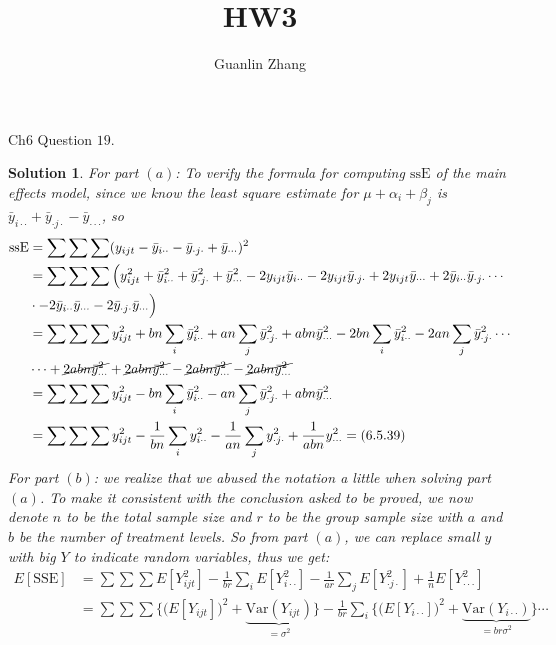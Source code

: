 \documentclass[11pt]{article}
\title{HW3}
\author{Guanlin Zhang}
\newtheorem{sol}{Solution}
\begin{document}
Ch6 Question $19$.
\begin{sol}
	For part $(a)$:\vskip 2mm
	To verify the formula for computing $\text{ssE}$ of the main effects model, since we know the least square estimate for $\mu + \alpha_i + \beta_j$ is $\bar{y}_{i\cdot\cdot} + \bar{y}_{\cdot j \cdot} - \bar{y}_{\cdot\cdot\cdot}$, so
	\begin{align*}
		\text{ssE} &= \sum\sum\sum(y_{ijt} - \bar{y}_{i\cdot\cdot} - \bar{y}_{\cdot j \cdot} + \bar{y}_{\cdot\cdot\cdot})^2\\
		&= \sum\sum\sum \Big(y^2_{ijt} + \bar{y}^2_{i\cdot\cdot} + \bar{y}^2_{\cdot j\cdot} + \bar{y}^2_{\cdot\cdot\cdot}- 2y_{ijt}\bar{y}_{i\cdot\cdot} - 2y_{ijt}\bar{y}_{\cdot j\cdot } + 2y_{ijt}\bar{y}_{\cdot\cdot\cdot} + 2\bar{y}_{i\cdot\cdot}\bar{y}_{\cdot j\cdot}\cdots\\
		&\cdot - 2\bar{y}_{i\cdot\cdot}\bar{y}_{\cdot\cdot\cdot} - 2\bar{y}_{\cdot j\cdot}\bar{y}_{\cdot\cdot\cdot}\Big) \\
		&= \sum\sum\sum y^2_{ijt} + bn\sum_i\bar{y}^2_{i\cdot\cdot} + an\sum_j\bar{y}^2_{\cdot j\cdot} + abn\bar{y}^2_{\cdot\cdot\cdot} - 2bn\sum_i \bar{y}^2_{i\cdot\cdot} - 2an\sum_j \bar{y}^2_{\cdot j\cdot}\cdots\\
		&\cdots + \cancel{2abn\bar{y}^2_{\cdot\cdot\cdot}} + \cancel{2abn\bar{y}^2_{\cdot\cdot\cdot}}
		- \cancel{2abn\bar{y}^2_{\cdot\cdot\cdot}} - \cancel{2abn\bar{y}^2_{\cdot\cdot\cdot}}\\
		&= \sum\sum\sum y^2_{ijt} - bn\sum_i \bar{y}^2_{i\cdot\cdot} - an\sum_j\bar{y}^2_{\cdot j\cdot} + abn\bar{y}^2_{\cdot\cdot\cdot}\\
		&= \sum\sum\sum y^2_{ijt} - \frac{1}{bn}\sum_i y^2_{i\cdot\cdot} - \frac{1}{an}\sum_j y^2_{\cdot j\cdot} + \frac{1}{abn}y^2_{\cdot\cdot\cdot} = (6.5.39)
	\end{align*}
	For part $(b)$:\vskip 2mm
	we realize that we abused the notation a little when solving part $(a)$. To make it consistent with the conclusion asked to be proved, we now denote $n$ to be the total sample size and $r$ to be the group sample size with $a$ and $b$ be the number of treatment levels.\vskip 2mm
	So from part $(a)$, we can replace small $y$ with big $Y$ to indicate random variables, thus we get:
	\begin{align*}
		E[\text{SSE}] &= \sum\sum\sum E[Y^2_{ijt}] - \frac{1}{br}\sum_i E[Y^2_{i\cdot\cdot}] - \frac{1}{ar}\sum_j E[Y^2_{\cdot j\cdot}] + \frac{1}{n}E[Y^2_{\cdot\cdot\cdot}]\\
		&= \sum\sum\sum \Big\{\Big(E[Y_{ijt}]\Big)^2 + \underbrace{\text{Var}(Y_{ijt})}_{ = \sigma^2}\Big\} - \frac{1}{br}\sum_i\Big\{\Big(E[Y_{i\cdot\cdot}]\Big)^2 + \underbrace{\text{Var}(Y_{i\cdot\cdot})}_{= br\sigma^2}\Big\}\cdots\\

\end{align*}
\end{sol}
\end{document}
